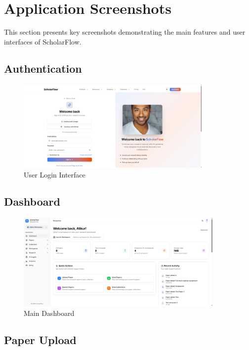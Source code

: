 \section{Application Screenshots}
\label{sec:screenshots}

This section presents key screenshots demonstrating the main features and user interfaces of ScholarFlow.

\subsection{Authentication}

\begin{figure}[H]
\centering
\includegraphics[width=0.85\textwidth]{images/screenshots/sign_in.png}
\caption{User Login Interface}
\label{fig:ss-login}
\end{figure}

\subsection{Dashboard}

\begin{figure}[H]
\centering
\includegraphics[width=0.9\textwidth]{images/screenshots/dashboard_overview.png}
\caption{Main Dashboard}
\label{fig:ss-dashboard}
\end{figure}

\subsection{Paper Upload}

